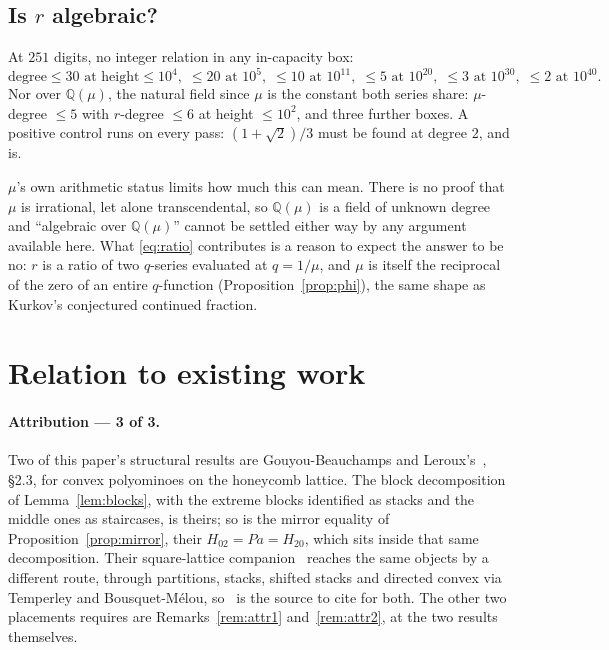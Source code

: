 \documentclass[11pt]{article}
\newcommand{\Q}{\mathbb{Q}}
\begin{document}
\subsection{Is \texorpdfstring{$r$}{r} algebraic?}
\label{sec:ralg}

At $251$ digits, no integer relation in any in-capacity box:
\[
  \text{degree} \le 30 \text{ at height} \le 10^4, \;\le 20 \text{ at } 10^5,
  \;\le 10 \text{ at } 10^{11}, \;\le 5 \text{ at } 10^{20},
  \;\le 3 \text{ at } 10^{30}, \;\le 2 \text{ at } 10^{40}.
\]
Nor over $\Q(\mu)$, the natural field since $\mu$ is the constant both series
share: $\mu$-degree $\le 5$ with $r$-degree $\le 6$ at height $\le 10^2$, and
three further boxes. A positive control runs on every pass: $(1+\sqrt2)/3$
must be found at degree $2$, and is.

$\mu$'s own arithmetic status limits how much this can mean. There is no
proof that $\mu$ is irrational, let alone transcendental, so $\Q(\mu)$ is a
field of unknown degree and ``algebraic over $\Q(\mu)$'' cannot be settled
either way by any argument available here. What \eqref{eq:ratio} contributes is
a reason to expect the answer to be no: $r$ is a ratio of two $q$-series
evaluated at $q = 1/\mu$, and $\mu$ is itself the reciprocal of the zero of an
entire $q$-function (Proposition~\ref{prop:phi}), the same shape as Kurkov's
conjectured continued fraction.

\section{Relation to existing work}
\label{sec:related}


\paragraph{Attribution --- 3 of 3.} Two of this paper's structural results are
Gouyou-Beauchamps and Leroux's~\cite{gblRoux2004}, \S2.3, for convex
polyominoes on the honeycomb lattice. The block decomposition of
Lemma~\ref{lem:blocks}, with the extreme blocks identified as stacks and the
middle ones as staircases, is theirs; so is the mirror equality of
Proposition~\ref{prop:mirror}, their $H_{02} = Pa = H_{20}$, which sits inside
that same decomposition. Their square-lattice companion~\cite{lrr1998} reaches
the same objects by a different route, through partitions, stacks, shifted
stacks and directed convex via Temperley and Bousquet-M\'elou,
so~\cite{gblRoux2004} is the source to cite for both. The other two placements
 requires are Remarks~\ref{rem:attr1}
and~\ref{rem:attr2}, at the two results themselves.
\end{document}
